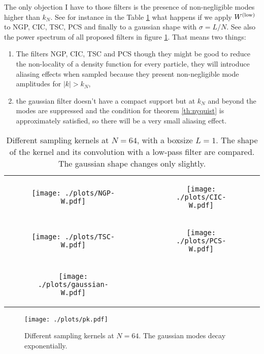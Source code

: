 The only objection I have to those filters is the presence of non-negligible
modes higher than $k_N$. See for instance in
the Table \ref{tab:wfilters} what happens if we apply $W^\mathrm{(low)}$ to
NGP, CIC, TSC, PCS and finally to a gaussian shape with $\sigma = L/N$.
See also the power spectrum of all proposed filters in figure \ref{fig:pk}.
That means two things:
\begin{enumerate}
    \item The filters NGP, CIC, TSC and PCS though they might be good
    to reduce the non-locality of a density function for every particle,
    they will introduce aliasing effects when sampled because
    they present non-negligible mode amplitudes for $|k|>k_N$,
    \item the gaussian filter doesn't have a compact support
    but at $k_N$ and beyond the modes are suppressed and 
    the condition for theorem \ref{th:nyquist} is approximately satisfied,
    so there will be a very small aliasing effect.
\end{enumerate}

{\centering%
\begin{table}
    \begin{tabular}{cc}
        \begin{subfigure}{.5\textwidth}
            \centering\texttt{[image: ./plots/NGP-W.pdf]}
        \end{subfigure} &
        \begin{subfigure}{.5\textwidth}
            \centering\texttt{[image: ./plots/CIC-W.pdf]}
        \end{subfigure} \\
        \begin{subfigure}{.5\textwidth}
            \centering\texttt{[image: ./plots/TSC-W.pdf]}
        \end{subfigure} &
        \begin{subfigure}{.5\textwidth}
            \centering\texttt{[image: ./plots/PCS-W.pdf]}
        \end{subfigure} \\
        \begin{subfigure}{.5\textwidth}
            \centering\texttt{[image: ./plots/gaussian-W.pdf]}
        \end{subfigure} &
        \begin{subfigure}{.5\textwidth}
        \end{subfigure} \\
    \end{tabular}
    \caption{Different sampling kernels at $N=64$, with a boxsize $L=1$.
    The shape of the kernel and its convolution with a low-pass filter
    are compared. The gaussian shape changes only slightly.}
    \label{tab:wfilters}
\end{table}
}
\begin{figure}
    \centering\texttt{[image: ./plots/pk.pdf]}
    \caption{Different sampling kernels at $N=64$. The gaussian
    modes decay exponentially.}
    \label{fig:pk}
\end{figure}


